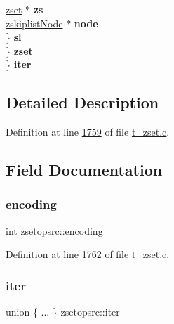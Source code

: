 \begin{DoxyCompactItemize}
\begin{tabbing}
\mbox{\label{structzsetopsrc_1_1_0D15_1_1__iterzset_1_1_0D19_a9aeae9b092dd392b29d133a9bb89f106}} 
\hyperlink{structzset}{zset} $\ast$ {\bfseries zs}\\
\mbox{\label{structzsetopsrc_1_1_0D15_1_1__iterzset_1_1_0D19_a8fddead5a211a1f361c5411ec030e487}} 
\hyperlink{structzskiplistNode}{zskiplistNode} $\ast$ {\bfseries node}\\
\>\>\} {\bfseries sl}\\
\>\} {\bfseries zset}\\
\} {\bfseries iter}\\

\end{tabbing}\end{DoxyCompactItemize}


\subsection{Detailed Description}


Definition at line \hyperlink{t__zset_8c_source_l01759}{1759} of file \hyperlink{t__zset_8c_source}{t\+\_\+zset.\+c}.



\subsection{Field Documentation}
\mbox{\label{structzsetopsrc_a0314e4c6e92bc66f9d5ac23c0ae69b45}} 
\subsubsection{\texorpdfstring{encoding}{encoding}}
{\footnotesize\ttfamily int zsetopsrc\+::encoding}



Definition at line \hyperlink{t__zset_8c_source_l01762}{1762} of file \hyperlink{t__zset_8c_source}{t\+\_\+zset.\+c}.

\mbox{\label{structzsetopsrc_a283ca39d9a0667c8f68a820af15d45b5}} 
\subsubsection{\texorpdfstring{iter}{iter}}
{\footnotesize\ttfamily union \{ ... \}   zsetopsrc\+::iter}

